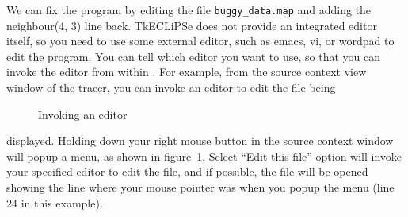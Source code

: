 \begin{sloppypar}
 We can fix the program by editing
the file \verb'buggy_data.map' and adding the neighbour(4, 3) line back.
TkECLiPSe does not provide an integrated editor itself, so you need to use
some external editor, such as emacs, vi, or wordpad to edit the program. 
You can tell \eclipse which editor you want to use, so that you can invoke
the editor from within \eclipse. For example, from the source context view
window of the tracer, you can invoke an editor to edit the file being
\begin{figure}
\begin{center}
\end{center}
\caption{Invoking an editor}
\label{tkeditor}
\end{figure}
displayed. Holding down your right mouse button in the source context
window will popup a menu, as shown in figure~\ref{tkeditor}. Select ``Edit
this file'' option will invoke your specified editor to edit the file, and if
possible, the file will be opened showing the line where your mouse pointer
was when you popup the menu (line 24 in this example).



\end{sloppypar}
